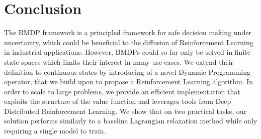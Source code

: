 \documentclass{article}
\begin{document}
\section{Conclusion}
The BMDP framework is a principled framework for safe decision making under uncertainty, which could be beneficial to the diffusion of Reinforcement Learning in industrial applications. However, BMDPs could so far only be solved in finite state spaces which limits their interest in many use-cases. We extend their definition to continuous states by introducing of a novel Dynamic Programming operator, that we build upon to propose a Reinforcement Learning algorithm. In order to scale to large problems, we provide an efficient implementation that exploits the structure of the value function and leverages tools from Deep Distributed Reinforcement Learning. We show that on two practical tasks, our solution performs similarly to a baseline Lagrangian relaxation method while only requiring a single model to train.



%
\clearpage



\clearpage

\end{document}

